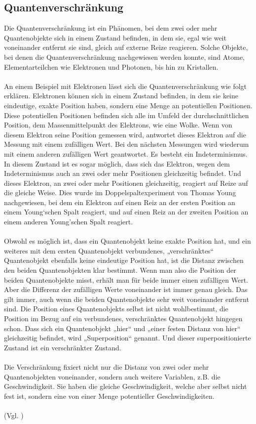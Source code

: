\subsection{Quantenverschränkung}
Die Quantenverschränkung ist ein Phänomen, bei dem zwei oder mehr Quantenobjekte sich in einem Zustand befinden, in dem sie, egal wie weit voneinander entfernt sie sind, gleich auf externe Reize reagieren. Solche Objekte, bei denen die Quantenverschränkung nachgewiesen werden konnte, sind Atome, Elementarteilchen wie Elektronen und Photonen, bis hin zu Kristallen.\\
\\
An einem Beispiel mit Elektronen lässt sich die Quantenverschränkung wie folgt erklären. Elektronen können sich in einem Zustand befinden, in dem sie keine eindeutige, exakte Position haben, sondern eine Menge an potentiellen Positionen. Diese potentiellen Positionen befinden sich alle im Umfeld der durchschnittlichen Position, dem Massenmittelpunkt des Elektrons, wie eine Wolke. Wenn von diesem Elektron seine Position gemessen wird, antwortet dieses Elektron auf die Messung mit einem zufälligen Wert. Bei den nächsten Messungen wird wiederum mit einem anderen zufälligen Wert geantwortet. Es besteht ein Indeterminismus. In diesem Zustand ist es sogar möglich, dass sich das Elektron, wegen dem Indeterminismus auch an zwei oder mehr Positionen gleichzeitig befindet. Und dieses Elektron, an zwei oder mehr Positionen gleichzeitig, reagiert auf Reize auf die gleiche Weise. Dies wurde im Doppelspaltexperiment von Thomas Young nachgewiesen, bei dem ein Elektron auf einen Reiz an der ersten Position an einem Young‘schen Spalt reagiert, und auf einen Reiz an der zweiten Position an einem anderen Young’schen Spalt reagiert.\\
\\
Obwohl es möglich ist, dass ein Quantenobjekt keine exakte Position hat, und ein weiteres mit dem ersten Quantenobjekt verbundenes, „verschränktes“ Quantenobjekt ebenfalls keine eindeutige Position hat, ist die Distanz zwischen den beiden Quantenobjekten klar bestimmt. Wenn man also die Position der beiden Quantenobjekte misst, erhält man für beide immer einen zufälligen Wert. Aber die Differenz der zufälligen Werte voneinander ist immer genau gleich. Das gilt immer, auch wenn die beiden Quantenobjekte sehr weit voneinander entfernt sind. Die Position eines Quantenobjekts selbst ist nicht wohlbestimmt, die Position im Bezug auf ein verbundenes, verschränktes Quantenobjekt hingegen schon. Dass sich ein Quantenobjekt „hier“ und „einer festen Distanz von hier“ gleichzeitig befindet, wird „Superposition“ genannt. Und dieser superpositionierte Zustand ist ein verschränkter Zustand.\\
\\
Die Verschränkung fixiert nicht nur die Distanz von zwei oder mehr Quantenobjekten voneinander, sondern auch weitere Variablen, z.B. die Geschwindigkeit. Sie haben die gleiche Geschwindigkeit, welche aber selbst nicht fest ist, sondern eine von einer Menge potentieller Geschwindigkeiten.\\
\\
(Vgl. \cite[S.83-88]{gisin_unbegreifliche_2014}) 

